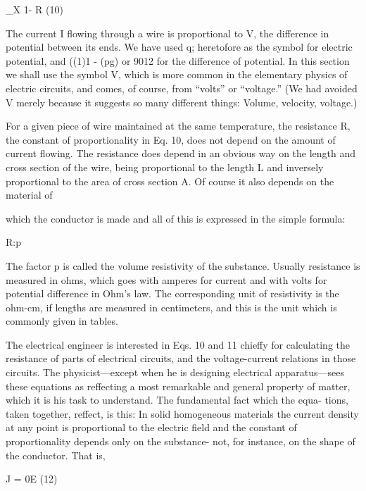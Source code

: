 _X
1- R (10)
\begin{equation}
\end{equation}

The current I flowing through a wire is proportional to V, the difference
in potential between its ends. We have used q; heretofore as
the symbol for electric potential, and ((1)1 - (pg) or 9012 for the difference
of potential. In this section we shall use the symbol V, which
is more common in the elementary physics of electric circuits, and
comes, of course, from ``volts'' or ``voltage.'' (We had avoided V
merely because it suggests so many different things: Volume, velocity,
voltage.)

For a given piece of wire maintained at the same temperature, the
resistance R, the constant of proportionality in Eq. 10, does not depend
on the amount of current flowing. The resistance does depend
in an obvious way on the length and cross section of the wire, being
proportional to the length L and inversely proportional to the area
of cross section A. Of course it also depends on the material of

which the conductor is made and all of this is expressed in the simple
formula:

R:p%
\begin{equation}
\end{equation}

The factor p is called the volume resistivity of the substance. Usually
resistance is measured in ohms, which goes with amperes for current
and with volts for potential difference in Ohm's law. The corresponding
unit of resistivity is the ohm-cm, if lengths are measured
in centimeters, and this is the unit which is commonly given in tables.

The electrical engineer is interested in Eqs. 10 and 11 chieffy for
calculating the resistance of parts of electrical circuits, and the
voltage-current relations in those circuits. The physicist---except
when he is designing electrical apparatus---sees these equations as
reffecting a most remarkable and general property of matter, which
it is his task to understand. The fundamental fact which the equa-
tions, taken together, reffect, is this: In solid homogeneous materials
the current density at any point is proportional to the electric field
and the constant of proportionality depends only on the substance-
not, for instance, on the shape of the conductor. That is,

J = 0E (12)
\begin{equation}
\end{equation}

